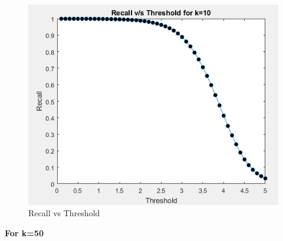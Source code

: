 \documentclass[12pt, onecolumn]{IEEEtran}
\begin{document}
\begin{figure}[h!]
\centering
\captionsetup{justification=centering}
\includegraphics[scale=0.59]{Graphs/3-7}
\caption{Recall vs Threshold}
\end{figure}
\newpage
\textbf{For k=50}
\end{document}
